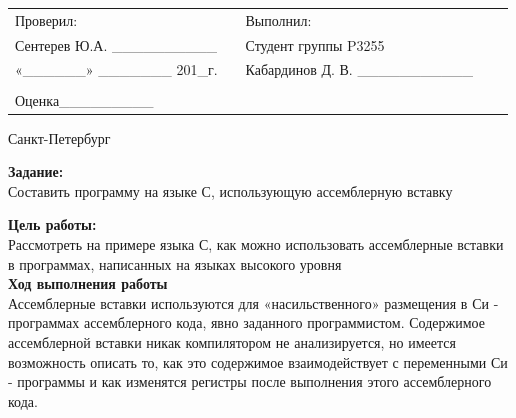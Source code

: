 \documentclass[12pt]{article}
\begin{document}
\begin{center}
\begin{tabular}{lllll}
Проверил:	 	 						& \hspace{80pt}	&	Выполнил:										&\\
Сентерев Ю.А.	 \_\_\_\_\_\_\_\_\_\_	&			    &	Студент группы P3255							&\\
«\_\_\_\_\_\_» 	 \_\_\_\_\_\_\_ 201\_г.  & 				&	Кабардинов Д. В. \_\_\_\_\_\_\_\_\_\_\_			&\\
										&				&													&\\
Оценка\hspace{12pt}\_\_\_\_\_\_\_\_\_	&				&													&\\
\end{tabular}
\par\bigskip\par\bigskip\par\bigskip
                                                  
\par\bigskip \par\bigskip
\end{center}
\par\bigskip\par\bigskip\par\bigskip\par\bigskip\par\bigskip\par\bigskip\par\bigskip\par\bigskip
\begin{center}
Санкт-Петербург
\par{}
\end{center}
\pagebreak
\textbf{Задание:} \\
Составить программу на языке С, использующую ассемблерную вставку \\
\par

\textbf{Цель работы:} \\
Рассмотреть на примере языка С, как можно использовать ассемблерные вставки в программах, написанных на языках высокого уровня \\

\textbf{Ход выполнения работы}\\
Ассемблерные  вставки  используются  для  «насильственного»  размещения  в  Си
-
программах 
ассемблерного кода, явно заданного программистом. Содержимое ассемблерной вставки никак компилятором не анализируется, но имеется возможность описать то, как это содержимое взаимодействует с переменными Си - программы и как изменятся регистры после выполнения этого ассемблерного кода.
\end{document}
